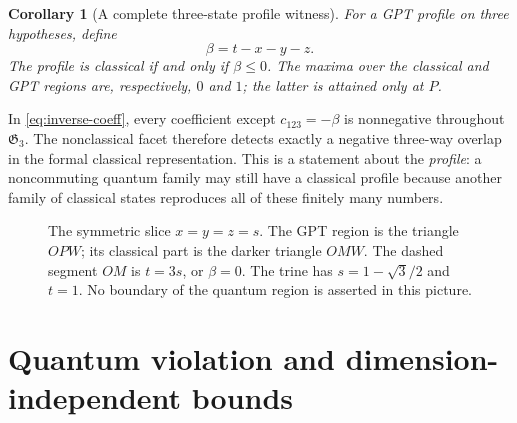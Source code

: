 \documentclass[a4paper,11pt,onecolumn,unpublished]{quantumarticle}
\newtheorem{corollary}[theorem]{Corollary}
\theoremstyle{definition}
\newcommand{\1}{\mathbf 1}
\newcommand{\Creg}{\mathfrak C}
\newcommand{\Greg}{\mathfrak G}
\begin{document}
\begin{corollary}[A complete three-state profile witness]\label{cor:unique-facet}
For a GPT profile on three hypotheses, define
\begin{equation}\label{eq:beta}
 \beta=t-x-y-z.
\end{equation}
The profile is classical if and only if $\beta\le0$. The maxima over the
classical and GPT regions are, respectively, $0$ and $1$; the latter is
attained only at $P$.
\end{corollary}

In \eqref{eq:inverse-coeff}, every coefficient except $c_{123}=-\beta$ is
nonnegative throughout $\Greg_3$. The nonclassical facet therefore detects
exactly a negative three-way overlap in the formal classical representation.
This is a statement about the \emph{profile}: a noncommuting quantum family may
still have a classical profile because another family of classical states
reproduces all of these finitely many numbers.

\begin{figure}[t]
\centering
{}
\caption{The symmetric slice $x=y=z=s$. The GPT region is the triangle $OPW$;
its classical part is the darker triangle $OMW$. The dashed segment $OM$ is
$t=3s$, or $\beta=0$. The trine has $s=1-\sqrt3/2$ and $t=1$.
No boundary of the quantum region is asserted in this picture.}
\label{fig:slice}
\end{figure}

\section{Quantum violation and dimension-independent bounds}\label{sec:quantum}
\end{document}

